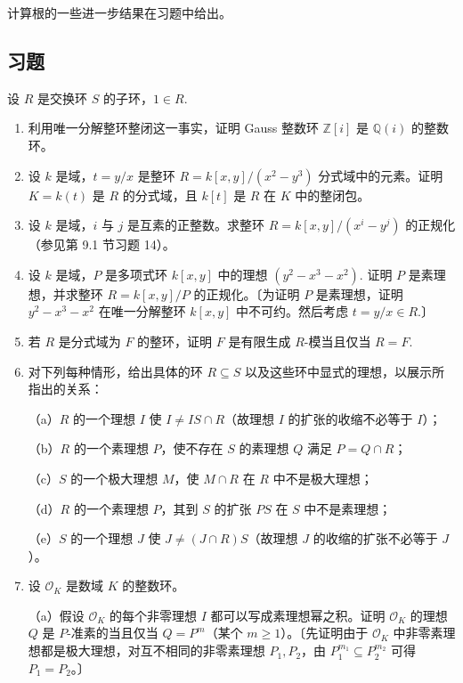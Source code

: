 计算根的一些进一步结果在习题中给出。

\subsection*{习题}

设 \(R\) 是交换环 \(S\) 的子环，\(1 \in R\).

\begin{enumerate}
\item 利用唯一分解整环整闭这一事实，证明 Gauss 整数环 \(\mathbb{Z}[i]\) 是 \(\mathbb{Q}(i)\) 的整数环。

\item 设 \(k\) 是域，\(t = y/x\) 是整环 \(R = k[x,y]/(x^2-y^3)\) 分式域中的元素。证明 \(K = k(t)\) 是 \(R\) 的分式域，且 \(k[t]\) 是 \(R\) 在 \(K\) 中的整闭包。

\item 设 \(k\) 是域，\(i\) 与 \(j\) 是互素的正整数。求整环 \(R = k[x,y]/(x^i-y^j)\) 的正规化（参见第 9.1 节习题 14）。

\item 设 \(k\) 是域，\(P\) 是多项式环 \(k[x,y]\) 中的理想 \((y^2-x^3-x^2)\). 证明 \(P\) 是素理想，并求整环 \(R = k[x,y]/P\) 的正规化。〔为证明 \(P\) 是素理想，证明 \(y^2-x^3-x^2\) 在唯一分解整环 \(k[x,y]\) 中不可约。然后考虑 \(t = y/x \in R\).〕

\item 若 \(R\) 是分式域为 \(F\) 的整环，证明 \(F\) 是有限生成 \(R\)-模当且仅当 \(R = F\).

\item 对下列每种情形，给出具体的环 \(R \subseteq S\) 以及这些环中显式的理想，以展示所指出的关系：

（a）\(R\) 的一个理想 \(I\) 使 \(I \neq IS \cap R\)（故理想 \(I\) 的扩张的收缩不必等于 \(I\)）；

（b）\(R\) 的一个素理想 \(P\)，使不存在 \(S\) 的素理想 \(Q\) 满足 \(P = Q \cap R\)；

（c）\(S\) 的一个极大理想 \(M\)，使 \(M \cap R\) 在 \(R\) 中不是极大理想；

（d）\(R\) 的一个素理想 \(P\)，其到 \(S\) 的扩张 \(PS\) 在 \(S\) 中不是素理想；

（e）\(S\) 的一个理想 \(J\) 使 \(J \neq (J \cap R)S\)（故理想 \(J\) 的收缩的扩张不必等于 \(J\)）。

\item 设 \(\mathcal{O}_K\) 是数域 \(K\) 的整数环。

（a）假设 \(\mathcal{O}_K\) 的每个非零理想 \(I\) 都可以写成素理想幂之积。证明 \(\mathcal{O}_K\) 的理想 \(Q\) 是 \(P\)-准素的当且仅当 \(Q = P^m\)（某个 \(m \geq 1\)）。〔先证明由于 \(\mathcal{O}_K\) 中非零素理想都是极大理想，对互不相同的非零素理想 \(P_1, P_2\)，由 \(P_1^{m_1} \subseteq P_2^{m_2}\) 可得 \(P_1 = P_2\)。〕


\end{enumerate}
